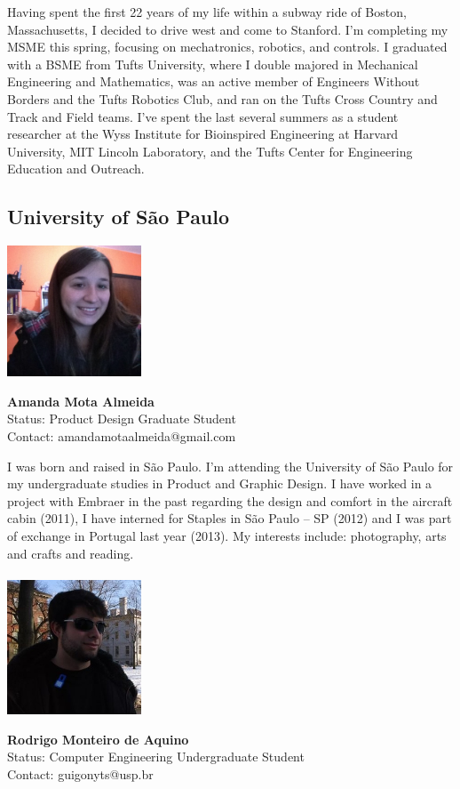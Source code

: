 Having spent the first 22 years of my life within a subway ride of Boston, Massachusetts, I decided to drive west and come to Stanford. I'm completing my MSME this spring, focusing on mechatronics, robotics, and controls. I graduated with a BSME from Tufts University, where I double majored in Mechanical Engineering and Mathematics, was an active member of Engineers Without Borders and the Tufts Robotics Club, and ran on the Tufts Cross Country and Track and Field teams. I've spent the last several summers as a student researcher at the Wyss Institute for Bioinspired Engineering at Harvard University, MIT Lincoln Laboratory, and the Tufts Center for Engineering Education and Outreach.

\subsection*{University of S\~{a}o Paulo}

\noindent \includegraphics[width=40mm]{images/image013}
\parbox[b]{0.6\textwidth}{\textbf{Amanda Mota Almeida}\\
Status: Product Design Graduate Student\\
Contact: amandamotaalmeida@gmail.com \\
}

I was born and raised in S\~{a}o Paulo. I'm attending the University of S\~{a}o Paulo for my undergraduate studies in Product and Graphic Design. I have worked in a project with Embraer in the past regarding the design and comfort in the aircraft cabin (2011), I have interned for Staples in S\~{a}o Paulo – SP (2012) and I was part of exchange in Portugal last year (2013). My interests include: photography, arts and crafts and reading.
\\ \\

\noindent \includegraphics[width=40mm]{images/image014}
\parbox[b]{0.6\textwidth}{\textbf{Rodrigo Monteiro de Aquino}\\
Status: Computer Engineering Undergraduate Student \\
Contact: guigonyts@usp.br \\
}

